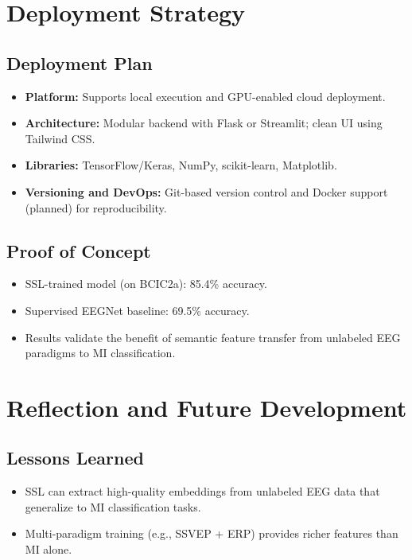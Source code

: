 \section{Deployment Strategy}
\label{sec:deployment}


\subsection{Deployment Plan}
\label{subsec:deployment-plan}
\begin{itemize}[leftmargin=3.5em]
    \item \textbf{Platform:} Supports local execution and GPU-enabled cloud deployment.
    \item \textbf{Architecture:} Modular backend with Flask or Streamlit; clean UI using Tailwind CSS.
    \item \textbf{Libraries:} TensorFlow/Keras, NumPy, scikit-learn, Matplotlib.
    \item \textbf{Versioning and DevOps:} Git-based version control and Docker support (planned) for reproducibility.
\end{itemize}


\subsection{Proof of Concept}
\label{subsec:proof-of-concept}
\begin{itemize}[leftmargin=3.5em]
    \item SSL-trained model (on BCIC2a): 85.4\% accuracy.
    \item Supervised EEGNet baseline: 69.5\% accuracy.
    \item Results validate the benefit of semantic feature transfer from unlabeled EEG paradigms to MI classification.
\end{itemize}

\section{Reflection and Future Development}
\label{sec:reflection}


\subsection*{Lessons Learned}
\begin{itemize}[leftmargin=3.5em]
    \item SSL can extract high-quality embeddings from unlabeled EEG data that generalize to MI classification tasks.
    \item Multi-paradigm training (e.g., SSVEP + ERP) provides richer features than MI alone.
\end{itemize}


